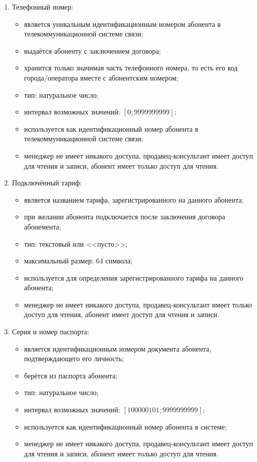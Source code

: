 \begin{enumerate}
\begin{enumerate}
        \item Телефонный номер:
        \begin{itemize}
            \item является уникальным идентификационным номером абонента в телекоммуникационной системе связи;
            \item выдаётся абоненту с заключением договора;
            \item хранится только значимая часть телефонного номера, то есть его код города/оператора вместе с абонентским номером; 
            \item тип: натуральное число;
            \item интервал возможных значений: $[0; 9 999 999 999]$;
            \item используется как идентификационный номер абонента в телекоммуникационной системе связи;
            \item менеджер не имеет никакого доступа, продавец-консультант имеет доступ для чтения и записи, абонент имеет только доступ для чтения.
        \end{itemize}

        \item Подключённый тариф:
        \begin{itemize}
            \item является названием тарифа, зарегистрированного на данного абонента;
            \item при желании абонента подключается после заключения договора абонемента;
            \item тип: текстовый или <<пусто>>;
            \item максимальный размер: 64 символа; %
            \item используется для определения зарегистрированного тарифа на данного абонента;
            \item менеджер не имеет никакого доступа, продавец-консультант имеет только доступ для чтения, абонент имеет доступ для чтения и записи.
        \end{itemize}

        \item Серия и номер паспорта:
        \begin{itemize}
            \item является идентификационным номером документа абонента, подтверждающего его личность;
            \item берётся из паспорта абонента;
            \item тип: натуральное число;
            \item интервал возможных значений: $[100000101; 9 999 999 999]$;
            \item используется как идентификационный номер абонента в системе;
            \item менеджер не имеет никакого доступа, продавец-консультант имеет доступ для чтения и записи, абонент имеет только доступ для чтения.
        \end{itemize}


\end{enumerate}
\end{enumerate}
